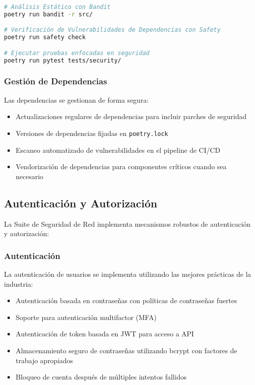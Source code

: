 \begin{lstlisting}[language=bash, caption=Comandos de Pruebas de Seguridad]
# Análisis Estático con Bandit
poetry run bandit -r src/

# Verificación de Vulnerabilidades de Dependencias con Safety
poetry run safety check

# Ejecutar pruebas enfocadas en seguridad
poetry run pytest tests/security/
\end{lstlisting}

\subsubsection{Gestión de Dependencias}
Las dependencias se gestionan de forma segura:

\begin{itemize}
    \item Actualizaciones regulares de dependencias para incluir parches de seguridad
    \item Versiones de dependencias fijadas en \texttt{poetry.lock}
    \item Escaneo automatizado de vulnerabilidades en el pipeline de CI/CD
    \item Vendorización de dependencias para componentes críticos cuando sea necesario
\end{itemize}

\subsection{Autenticación y Autorización}
La Suite de Seguridad de Red implementa mecanismos robustos de autenticación y autorización:

\subsubsection{Autenticación}
La autenticación de usuarios se implementa utilizando las mejores prácticas de la industria:

\begin{itemize}
    \item Autenticación basada en contraseñas con políticas de contraseñas fuertes
    \item Soporte para autenticación multifactor (MFA)
    \item Autenticación de token basada en JWT para acceso a API
    \item Almacenamiento seguro de contraseñas utilizando bcrypt con factores de trabajo apropiados
    \item Bloqueo de cuenta después de múltiples intentos fallidos
\end{itemize}

